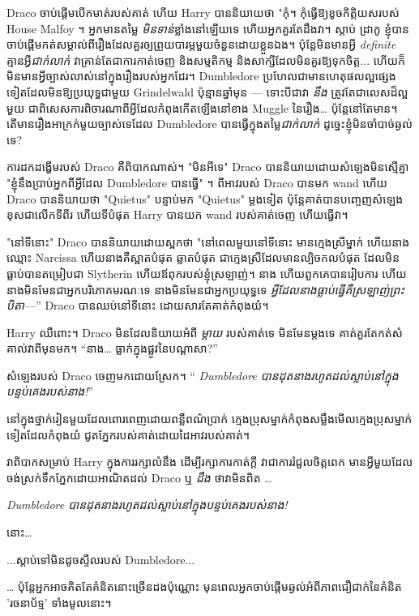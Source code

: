{{{{{Draco ចាប់ផ្តើមបើកមាត់របស់គាត់ ហើយ Harry បាននិយាយថា "កុំ។ កុំធ្វើឱ្យខូចកិត្តិយសរបស់ House Malfoy ។ អ្នកមានតម្លៃ \emph{មិនទាន់}ខ្លាំងនៅឡើយទេ ហើយអ្នកគួរតែដឹងវា។ ស្តាប់ ដ្រាកូ ខ្ញុំ​បាន​ចាប់​ផ្តើម​កត់​សម្គាល់​ពី​រឿង​ដែល​គួរ​ឲ្យ​ព្រួយ​បារម្ភ​មួយ​ចំនួន​ដោយ​ខ្លួន​ឯង។ ប៉ុន្តែមិនមានអ្វី \emph{definite} គ្មានអ្វី\emph{ជាក់លាក់} វាគ្រាន់តែជាការកាត់ចេញ និងសម្មតិកម្ម និងសាក្សីដែលមិនគួរឱ្យទុកចិត្ត... ហើយក៏មិនមានអ្វីច្បាស់លាស់នៅក្នុងរឿងរបស់អ្នកដែរ។ Dumbledore ប្រហែលជាមានហេតុផលល្អផ្សេងទៀតដែលមិនឱ្យប្រយុទ្ធជាមួយ Grindelwald ប៉ុន្មានឆ្នាំមុន — ទោះបីជាវា \emph{នឹង} ត្រូវតែជាលេសដ៏ល្អមួយ ជាពិសេសការពិចារណាពីអ្វីដែលកំពុងកើតឡើងនៅខាង Muggle នៃរឿង… ប៉ុន្តែនៅតែមាន។ តើមានរឿងអាក្រក់មួយច្បាស់ទេដែល Dumbledore បានធ្វើក្នុងតម្លៃ\emph{ជាក់លាក់} ដូច្នេះខ្ញុំមិនចាំបាច់ឆ្ងល់ទេ?

ការដកដង្ហើមរបស់ Draco គឺពិបាកណាស់។ "មិនអីទេ" Draco បាននិយាយដោយសំឡេងមិនស្មើគ្នា "ខ្ញុំនឹងប្រាប់អ្នកពីអ្វីដែល Dumbledore បានធ្វើ" ។ ពីអាវរបស់ Draco បានមក wand ហើយ Draco បាននិយាយថា "Quietus" បន្ទាប់មក "Quietus" ម្តងទៀត ប៉ុន្តែគាត់បានបញ្ចេញសំឡេងខុសជាលើកទីពីរ ហើយទីបំផុត Harry បានយក wand របស់គាត់ចេញ ហើយធ្វើវា។

"នៅទីនោះ" Draco បាននិយាយដោយស្អកថា "នៅពេលមួយនៅទីនោះ មានក្មេងស្រីម្នាក់ ហើយនាងឈ្មោះ Narcissa ហើយនាងគឺស្អាតបំផុត ឆ្លាតបំផុត ជាក្មេងស្រីដែលមានល្បិចកលបំផុត ដែលមិនធ្លាប់បានតម្រៀបជា Slytherin ហើយឪពុករបស់ខ្ញុំស្រឡាញ់។ នាង ហើយពួកគេបានរៀបការ ហើយនាងមិនមែនជាអ្នកបរិភោគមរណៈទេ នាងមិនមែនជាអ្នកប្រយុទ្ធទេ \emph{អ្វីដែលនាងធ្លាប់ធ្វើគឺស្រឡាញ់ព្រះបិតា—}” Draco បានឈប់នៅទីនោះ ដោយសារតែគាត់កំពុងយំ។

Harry ឈឺពោះ។ Draco មិនដែលនិយាយអំពី \emph{ម្តាយ} របស់គាត់ទេ មិនមែនម្តងទេ គាត់គួរតែកត់សំគាល់វាពីមុនមក។ “នាង… ធ្លាក់ក្នុងផ្លូវនៃបណ្តាសា?”

សំឡេងរបស់ Draco ចេញមកដោយស្រែក។ “\emph{ Dumbledore បានដុតនាងរហូតដល់ស្លាប់នៅក្នុងបន្ទប់គេងរបស់នាង!}”

\later

នៅក្នុងថ្នាក់រៀនមួយដែលពោរពេញដោយពន្លឺពណ៌ប្រាក់ ក្មេងប្រុសម្នាក់កំពុងសម្លឹងមើលក្មេងប្រុសម្នាក់ទៀតដែលកំពុងយំ ជូតភ្នែករបស់គាត់ដោយដៃអាវរបស់គាត់។

វាពិបាកសម្រាប់ Harry ក្នុងការរក្សាលំនឹង ដើម្បីរក្សាការកាត់ក្តី វាជាការរំជួលចិត្តពេក មានអ្វីមួយដែលចង់ស្រក់ទឹកភ្នែកដោយអាណិតដល់ Draco ឬ \emph{ដឹង} ថាវាមិនពិត …

\emph{Dumbledore បានដុតនាងរហូតដល់ស្លាប់នៅក្នុងបន្ទប់គេងរបស់នាង!}

នោះ…

...ស្តាប់ទៅមិនដូចស្ទីលរបស់ Dumbledore...

… ប៉ុន្តែអ្នកអាចគិតតែគំនិតនោះច្រើនដងប៉ុណ្ណោះ មុនពេលអ្នកចាប់ផ្តើមឆ្ងល់អំពីភាពជឿជាក់នៃគំនិត 'រចនាប័ទ្ម' ទាំងមូលនោះ។

}}}}}
